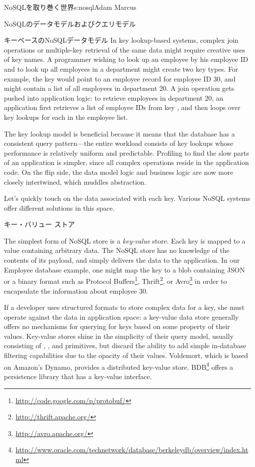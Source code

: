 \begin{aosachapter}{NoSQLを取り巻く世界}{s:nosql}{Adam Marcus}
\begin{aosasect1}{NoSQLのデータモデルおよびクエリモデル}
\begin{aosasect2}{キーベースのNoSQLデータモデル}
In key lookup-based systems, complex join operations or multiple-key
retrieval of the same data might require creative uses of key names.
A programmer wishing to look up an employee by his
employee ID and to look up all employees in a department might create
two key types.  For example, the key  would point to an employee
record for employee ID 30, and  might
contain a list of all employees in department 20.  A join operation
gets pushed into application logic: to retrieve employees in
department 20, an application first retrieves a list of employee IDs
from key , and then loops over key
lookups for each  in the employee list.

The key lookup model is beneficial because it means that the database
has a consistent query pattern---the entire workload consists of key
lookups whose performance is relatively uniform and predictable.
Profiling to find the slow parts of an application is simpler, since
all complex operations reside in the application code.  On the flip
side, the data model logic and business logic are now more closely
intertwined, which muddles abstraction.

Let's quickly touch on the data associated with each key.  Various
NoSQL systems offer different solutions in this space.

\begin{aosasect3}{キー・バリュー ストア}

The simplest form of NoSQL store is a \emph{key-value} store.  Each
key is mapped to a value containing arbitrary data.  The NoSQL store
has no knowledge of the contents of its payload, and simply delivers
the data to the application.  In our Employee database example, one
might map the key  to a blob containing JSON or a
binary format such as Protocol
Buffers\footnote{\url{http://code.google.com/p/protobuf/}},
Thrift\footnote{\url{http://thrift.apache.org/}}, or
Avro\footnote{\url{http://avro.apache.org/}} in order to encapsulate
the information about employee 30.

If a developer uses structured formats to store complex data for a
key, she must operate against the data in application space: a
key-value data store generally offers no mechanisms for querying for
keys based on some property of their values.  Key-value stores shine
in the simplicity of their query model, usually consisting of
, , and  primitives, but discard the
ability to add simple in-database filtering capabilities due to the
opacity of their values.  Voldemort, which is based on Amazon's
Dynamo, provides a distributed key-value store.  BDB\footnote{\url{http://www.oracle.com/technetwork/database/berkeleydb/overview/index.html}} offers a
persistence library that has a key-value interface.


\end{aosasect3}
\end{aosasect2}
\end{aosasect1}
\end{aosachapter}
